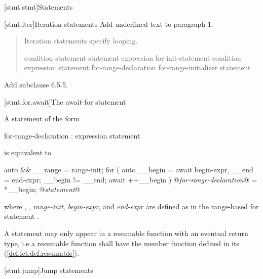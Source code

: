 
[stmt.stmt]{Statements}%

\setcounter{section}{4}
[stmt.iter]{Iteration statements}%
Add underlined text to paragraph 1.

\begin{quote}
\pnum
Iteration statements specify looping.

%
%
%
%
\begin{bnf}
	\br
	 condition \terminal{)} statement\br
	 statement  expression \terminal{) ;}\br
	 for-init-statement condition\opt \terminal{;} expression\opt \terminal{)} statement\br
	 for-range-declaration \terminal{:} for-range-initializer \terminal{)} statement\br
\end{bnf}
\end{quote}

Add subclause 6.5.5.

\setcounter{subsection}{4}
[stmt.for.await]{The await-for statement}%

\pnum
A  statement of the form

\begin{ncbnf}
	 for-range-declaration : expression \terminal{)} statement
\end{ncbnf}

is equivalent to

\begin{codeblock}
	{
		auto && __range = range-init;
		for ( auto __begin = await begin-expr,
		__end = end-expr;
		__begin != __end;
		await ++__begin ) {
			@\textit{for-range-declaration}@ = *__begin;
			@\textit{statement}@
		}
	}
\end{codeblock}

where , , 
\textit{range-init}, \textit{begin-expr}, and \textit{end-expr} are defined as in the range-based for statement .

\pnum
A  statement may only appear in a resumable function 
with an eventual return type, i.e a resumable function shall have the  member
function defined in its  (\ref{dcl.fct.def.resumable}).

\setcounter{section}{5}
[stmt.jump]{Jump statements}%

